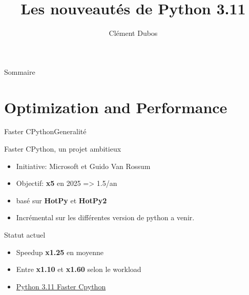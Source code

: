 \documentclass[aspectratio=169, xetex, 12pt]{beamer}
\title{Les nouveautés de Python 3.11}
\author{Clément Dubos}
\institute{Extia}
\date{\displaydate{date}}
\begin{document}
    \maketitle

    \begin{frame}{Sommaire}
        \hfill
        \parbox[t]{.9\textwidth}{
            \begin{minipage}[c][0.2\textheight]{\textwidth}
                \Large
                \tableofcontents
            \end{minipage}
        }
    \end{frame}

    \section{Optimization and Performance}

    \begin{frame}{Faster CPython}{Generalité}
        \begin{minipage}[t]{0.5\paperwidth}
            \begin{block}{Faster CPython, un projet ambitieux}
                \begin{itemize}
                    \item Initiative: Microsoft et Guido Van Rossum
                    \item Objectif: \textbf{x5} en 2025 => 1.5/an
                    \item basé sur \textbf{HotPy} et \textbf{HotPy2}
                    \item Incrémental sur les différentes version de python a venir.
                \end{itemize}
            \end{block}
        \end{minipage}
        \hspace{.1cm}
        \begin{minipage}[t]{0.4\paperwidth}
            \begin{block}{Statut actuel}
                \begin{itemize}
                    \item Speedup \textbf{x1.25} en moyenne
                    \item Entre \textbf{x1.10} et \textbf{x1.60} selon le workload
                    \item \href{https://docs.python.org/3.11/whatsnew/3.11.html\#faster-cpython}{Python 3.11 Faster Cpython}
                \end{itemize}
            \end{block}
        \end{minipage}
    \end{frame}
\end{document}
